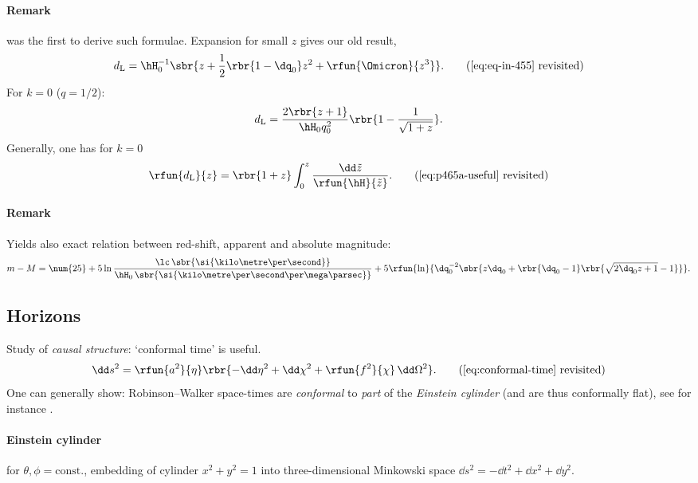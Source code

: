 \paragraph{Remark}
\cite{Mattig1957} was the first to derive such formulae. Expansion for small 
$z$ gives our old result,
\begin{equation}
d_\text{L} = \hH_0^{-1}\sbr{z + \frac{1}{2}\rbr{1-\dq_0}z^2 + 
\rfun{\Omicron}{z^3} }.
\tag{\ref{eq:eq-in-455} revisited}
\end{equation}
For $k = 0$ ($q = 1/2$):
\begin{equation}
d_\text{L} = \frac{2\rbr{z+1}}{\hH_0 q_0^2}\rbr{1-\frac{1}{\sqrt{1+z}}}.
\end{equation}
Generally, one has for $k = 0$
\begin{equation}
\rfun{d_\text{L}}{z} = \rbr{1+z}\int_0^z 
\frac{\dd\tilde{z}}{\rfun{\hH}{\tilde{z}}}.
\tag{\ref{eq:p465a-useful} revisited}
\end{equation}

\paragraph{Remark}
Yields also exact relation between red-shift, apparent and absolute magnitude:
\begin{equation}
m-M = \num{25} + 5\ln\frac{\lc\,\sbr{\si{\kilo\metre\per\second}}}%
{\hH_0\,\sbr{\si{\kilo\metre\per\second\per\mega\parsec}}} + 5\rfun{\ln}%
{\dq_0^{-2}\sbr{z\dq_0 + \rbr{\dq_0-1}\rbr{\sqrt{2\dq_0 z+1}-1}}}.
\end{equation}


\subsection{Horizons}
Study of \emph{causal structure}: `conformal time' is useful.
\begin{equation}
\dd s^2 = \rfun{a^2}{\eta} 
\rbr{-\dd\eta^2+\dd\chi^2+\rfun{f^2}{\chi}\,\dd\Omega^2}.
\tag{\ref{eq:conformal-time} revisited}
\end{equation}
One can generally show: Robinson--Walker space-times are \emph{conformal} to 
\emph{part} of the \emph{Einstein cylinder} (and are thus conformally flat), 
see for instance \cite[sec.\ 5.3]{Hawking1973}.

\paragraph{Einstein cylinder} for $\theta, \phi = \text{const.}$, embedding of 
cylinder $x^2+y^2 = 1$ into three-dimensional Minkowski space $\dd s^2 = -\dd 
t^2 + \dd x^2 + \dd y^2$.

